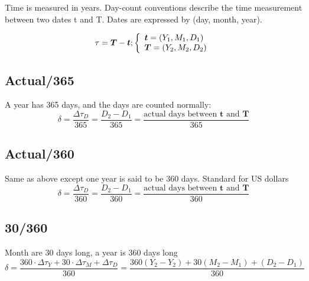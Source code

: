 \documentclass[11pt,a4paper]{article}
\numberwithin{equation}{section}
\begin{document}

	Time is measured in years. Day-count conventions describe the time measurement between two
	dates t and T. Dates are expressed by (day, month, year).

	\[ \tau = \boldsymbol{T} - \boldsymbol{t};  \left\{
	  \begin{array}{l l}
		  \boldsymbol{t} = (Y_1, M_1, D_1) \\
	\boldsymbol{T}=(Y_2,M_2,D_2)
	  \end{array} \right.\]


	\subsection{Actual/365}
	A year has 365 days, and the days are counted normally:
	\[
	\delta = \frac{\Delta \tau_D}{365} = \frac{D_2-D_1}{365} = \frac{\text{actual days between } \boldsymbol{t} \text{ and } \boldsymbol{T}}{365}
	\]
	\subsection{Actual/360}
	Same as above except one year is said to be 360 days. Standard for US dollars
	\[
	\delta = \frac{\Delta \tau_D}{360} =\frac{D_2-D_1}{360} = \frac{\text{actual days between } \boldsymbol{t} \text{ and } \boldsymbol{T}}{360}
	\]
	\subsection{30/360}
	Month are 30 days long, a year is 360 days long
	\[
	\delta = \frac{360 \cdot \Delta \tau_Y + 30 \cdot \Delta \tau_M + \Delta \tau_D}{360} =\frac{360(Y_2-Y_2)+30(M_2-M_1)+(D_2-D_1)}{360}
	\]
\end{document}

